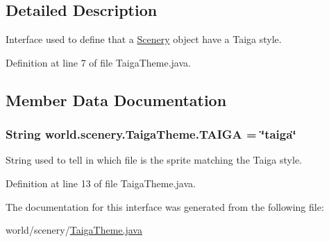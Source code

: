 \subsection{Detailed Description}
Interface used to define that a \hyperlink{a00024}{Scenery} object have a Taiga style. 

Definition at line 7 of file Taiga\-Theme.\-java.



\subsection{Member Data Documentation}
\hypertarget{a00028_ad3418d8f4936efb0ef1e3eb2009a34f0}{
\subsubsection[{T\-A\-I\-G\-A}]{\setlength{\rightskip}{0pt plus 5cm}String world.\-scenery.\-Taiga\-Theme.\-T\-A\-I\-G\-A = \char`\"{}taiga\char`\"{}\hspace{0.3cm}{\ttfamily [static]}}}\label{a00028_ad3418d8f4936efb0ef1e3eb2009a34f0}


String used to tell in which file is the sprite matching the Taiga style. 



Definition at line 13 of file Taiga\-Theme.\-java.



The documentation for this interface was generated from the following file\-:\begin{DoxyCompactItemize}
\item 
world/scenery/\hyperlink{a00074}{Taiga\-Theme.\-java}\end{DoxyCompactItemize}
